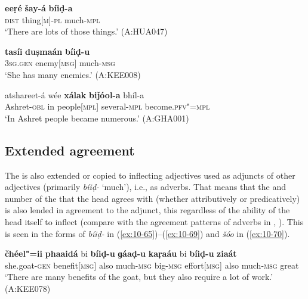 \begin{exe}
\ex
\label{ex:10-62}
\gll {\ob}\textbf{eeṛé} \textbf{šay-á}{\cb} {\ob}\textbf{bíiḍ-a}{\cb} \\
\textsc{dist} thing[\textsc{m}]-\textsc{pl} much-\textsc{mpl} \\
\glt `There are lots of those things.' (A:HUA047)

\ex
\label{ex:10-63}
\gll {\ob}\textbf{tasíi} \textbf{duṣmaán}{\cb} {\ob}\textbf{bíiḍ-u}{\cb} \\
\textsc{3sg.gen} enemy[\textsc{msg}] much-\textsc{msg} \\
\glt `She has many enemies.' (A:KEE008)

\ex
\label{ex:10-64}
\gll atshareet-á wée {\ob}\textbf{xálak}{\cb} {\ob}\textbf{biǰóol-a}{\cb} bhíl-a \\
Ashret-\textsc{obl} in people[\textsc{mpl}] several-\textsc{mpl} become.\textsc{pfv"=mpl} \\
\glt `In Ashret people became numerous.' (A:GHA001)
\end{exe}

\subsection{Extended agreement}
\label{subsec:10-3-4}


The  is also extended or copied to inflecting adjectives used as adjuncts of other adjectives (primarily \textit{bíiḍ-} `much'), i.e., as adverbs. That means that the  and number of the  that the  head agrees with (whether attributively or predicatively) is also lended in agreement to the  adjunct, this regardless of the ability of the  head itself to inflect (compare with the agreement patterns of adverbs in \iliGujarati, \citealt{hookjoshi1991}). This is seen in the forms of \textit{bíiḍ-} in (\ref{ex:10-65})--(\ref{ex:10-69}) and \textit{šóo} in (\ref{ex:10-70}).

\ea
\label{ex:10-65}
\gll {\ob}\textbf{čhéel"=ii} \textbf{phaaidá}{\cb} bi {\ob}\textbf{bíiḍ-u} \textbf{ɡáaḍ-u}{\cb} {\ob}\textbf{kaṛaáu}{\cb} bi {\ob}\textbf{bíiḍ-u} \textbf{ziaát}{\cb} \\
she.goat-\textsc{gen} benefit[\textsc{msg}] also much-\textsc{msg} big-\textsc{msg}  effort[\textsc{msg}] also much-\textsc{msg} great \\
\glt `There are many benefits of the goat, but they also require a lot of work.' (A:KEE078)

